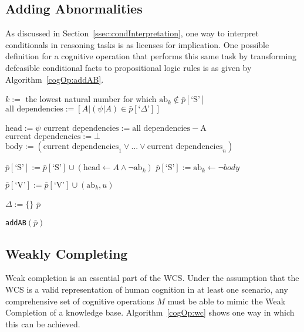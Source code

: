 \subsection{Adding Abnormalities}

As discussed in Section~\ref{ssec:condInterpretation}, one way to interpret conditionals in reasoning tasks is as licenses for implication. One possible definition for a cognitive operation that performs this same task by transforming defeasible conditional facts to propositional logic rules is as given by Algorithm~\ref{cogOp:addAB}.

\begin{algorithm}[H]
\SetAlgoLined
{}
{
{
$k:=$ the lowest natural number for which $\text{ab}_k \notin \bar{p}[\textrm{`S'}]$\;
$\text{all dependencies}:= [A | (\psi|A) \in \bar{p}[\textrm{`}\Delta\textrm{'}]]$\;

{
$\text{head}:=\psi$\;
$\text{current dependencies}:= \text{all dependencies} - \text{A}$\;
{
$\text{current dependencies}:=\bot$\;
}
$\text{body}:=(\text{current dependencies}_1 \lor ... \lor \text{current dependencies}_n)$\;

$\bar{p}[\textrm{`S'}]:= \bar{p}[\textrm{`S'}] \cup (\text{head} \leftarrow A \land \lnot \text{ab}_k)$\;
$\bar{p}[\textrm{`S'}]:= \text{ab}_k \leftarrow \lnot body$\;

}
$\bar{p}[\textrm{`V'}]:= \bar{p}[\textrm{`V'}] \cup (\text{ab}_k,u)$\;
}
$\Delta:=\{\}$\;
\Return $\bar{p}$
}
\caption{\texttt{addAB}$(\bar{p})$}
 \label{cogOp:addAB}
\end{algorithm}

\subsection{Weakly Completing}


Weak completion is an essential part of the WCS. Under the assumption that the WCS is a valid representation of human cognition in at least one scenario, any comprehensive set of cognitive operations $M$ must be able to mimic the Weak Completion of a knowledge base. Algorithm~\ref{cogOp:wc} shows one way in which this can be achieved.

